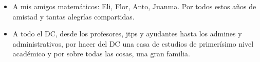 \begin{itemize}
    \item A mis amigos matemáticos: Eli, Flor, Anto, Juanma. Por todos estos años de amistad y tantas alegrías compartidas.
    \item A todo el DC, desde los profesores, jtps y ayudantes hasta los admines y administrativos, por hacer del DC una casa de estudios de primerísimo nivel académico y por sobre todas las cosas, una gran familia.
\end{itemize}
